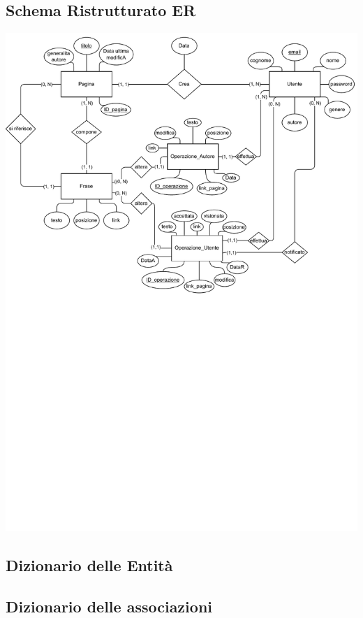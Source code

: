 \documentclass{article}
\begin{document}
\subsection{Schema Ristrutturato ER}
\includegraphics[width=1\textwidth]{Capitoli/Ristrutturazione/ER ristrutturato.pdf}

\newpage\newpage
\subsection{Dizionario delle Entità}


\newpage
\subsection{Dizionario delle associazioni}

\end{document}
